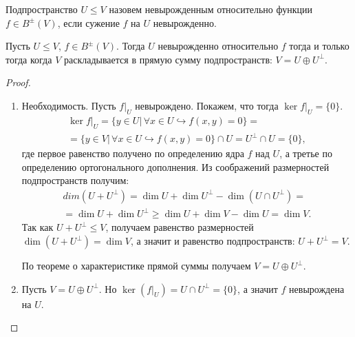 \begin{definition}
    Подпространство $U \leq V$ назовем невырожденным относительно функции $f \in B^{\pm}(V)$, если 
    сужение $f$ на $U$ невырожденно.
\end{definition}

\begin{theorem}
    \label{th8.1}
    Пусть $U \leq V$, $f \in B^{\pm}(V)$. Тогда $U$ невырожденно относительно $f$ тогда и только 
    тогда когда $V$ раскладывается в прямую сумму подпространств: $V = U \oplus U^{\perp}$.
\end{theorem}

\begin{proof}~
    \begin{enumerate}
        \item Необходимость. Пусть $f \vert_{U}$ невырождено. Покажем, что тогда 
        $\ker f \vert_{U} = \{0\}$.
        \begin{multline*}
            \ker f \vert_{U} = \{y \in U \vert \, \forall x \in U \hookrightarrow f(x, y) = 0\} = \\
            = \{y \in V \vert \, \forall x \in U \hookrightarrow f(x, y) = 0\} \cap U 
            = U^{\perp} \cap U = \{0\},
        \end{multline*}
        где первое равенство получено по определению ядра $f$ над $U$, а третье по определению 
        ортогонального дополнения. Из соображений размерностей подпространств получим:
        \begin{multline*}
            dim (U + U^{\perp}) = \dim U + \dim U^{\perp} - \dim (U \cap U^{\perp}) = \\ =
            \dim U + \dim U^{\perp} \geq \dim U + \dim V - \dim U = \dim V.
        \end{multline*} 
        Так как $U + U^{\perp} \leq V$, получаем равенство размерностей $\dim (U + U^{\perp}) = \dim V$, 
        а значит и равенство подпространств: $U + U^{\perp} = V$. 
        
        По теореме о характеристике прямой суммы получаем $V = U \oplus U^{\perp}$.

        \item Пусть $V = U \oplus U^{\perp}$. Но $\ker (f \vert_{U}) = U \cap U^{\perp} = \{0\}$, 
        а значит $f$ невырождена на $U$.
    \end{enumerate}
\end{proof}

